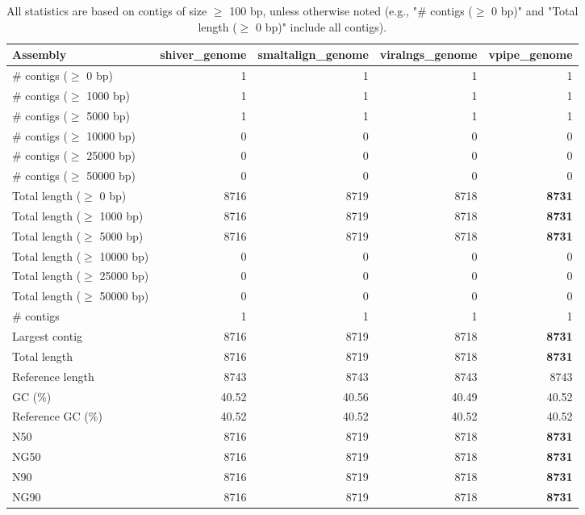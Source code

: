 \documentclass[12pt,a4paper]{article}
\begin{document}
\begin{table}[ht]
\begin{center}
\caption{All statistics are based on contigs of size $\geq$ 100 bp, unless otherwise noted (e.g., "\# contigs ($\geq$ 0 bp)" and "Total length ($\geq$ 0 bp)" include all contigs).}
\begin{tabular}{|l*{4}{|r}|}
\hline
Assembly & shiver\_genome & smaltalign\_genome & viralngs\_genome & vpipe\_genome \\ \hline
\# contigs ($\geq$ 0 bp) & 1 & 1 & 1 & 1 \\ \hline
\# contigs ($\geq$ 1000 bp) & 1 & 1 & 1 & 1 \\ \hline
\# contigs ($\geq$ 5000 bp) & 1 & 1 & 1 & 1 \\ \hline
\# contigs ($\geq$ 10000 bp) & 0 & 0 & 0 & 0 \\ \hline
\# contigs ($\geq$ 25000 bp) & 0 & 0 & 0 & 0 \\ \hline
\# contigs ($\geq$ 50000 bp) & 0 & 0 & 0 & 0 \\ \hline
Total length ($\geq$ 0 bp) & 8716 & 8719 & 8718 & {\bf 8731} \\ \hline
Total length ($\geq$ 1000 bp) & 8716 & 8719 & 8718 & {\bf 8731} \\ \hline
Total length ($\geq$ 5000 bp) & 8716 & 8719 & 8718 & {\bf 8731} \\ \hline
Total length ($\geq$ 10000 bp) & 0 & 0 & 0 & 0 \\ \hline
Total length ($\geq$ 25000 bp) & 0 & 0 & 0 & 0 \\ \hline
Total length ($\geq$ 50000 bp) & 0 & 0 & 0 & 0 \\ \hline
\# contigs & 1 & 1 & 1 & 1 \\ \hline
Largest contig & 8716 & 8719 & 8718 & {\bf 8731} \\ \hline
Total length & 8716 & 8719 & 8718 & {\bf 8731} \\ \hline
Reference length & 8743 & 8743 & 8743 & 8743 \\ \hline
GC (\%) & 40.52 & 40.56 & 40.49 & 40.52 \\ \hline
Reference GC (\%) & 40.52 & 40.52 & 40.52 & 40.52 \\ \hline
N50 & 8716 & 8719 & 8718 & {\bf 8731} \\ \hline
NG50 & 8716 & 8719 & 8718 & {\bf 8731} \\ \hline
N90 & 8716 & 8719 & 8718 & {\bf 8731} \\ \hline
NG90 & 8716 & 8719 & 8718 & {\bf 8731} \\ \hline

\end{tabular}
\end{center}
\end{table}
\end{document}
